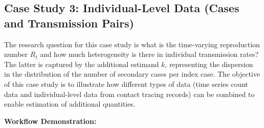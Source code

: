 \documentclass{article}
\begin{document}
\subsection{Case Study 3: Individual-Level Data (Cases and Transmission Pairs)}

The research question for this case study is what is the time-varying reproduction number $R_t$ and how much heterogeneity is there in individual transmission rates? The latter is captured by the additional estimand $k$, representing the dispersion in the distribution of the number of secondary cases per index case. The objective of this case study is to illustrate how different types of data (time series count data and individual-level data from contact tracing records) can be combined to enable estimation of additional quantities. 


\textbf{Workflow Demonstration:}
\end{document}
